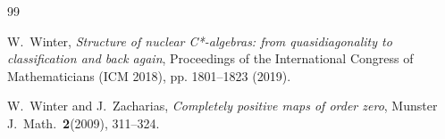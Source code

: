 \documentclass[11pt]{amsart}
\theoremstyle{plain}
\theoremstyle{definition}
\theoremstyle{remark}
\numberwithin{equation}{section}
\begin{document}
\begin{thebibliography}{99}



W.~Winter,
{\emph{Structure of nuclear C*-algebras: from quasidiagonality
to classification and back again}},
Proceedings of the International Congress of Mathematicians 
(ICM 2018), pp. 1801--1823 (2019).

W.~Winter and J.~Zacharias,
{\emph{Completely positive maps of order zero}},
Munster J.\  Math.\  {\textbf{2}}(2009), 311--324.

\end{thebibliography}
\end{document}
